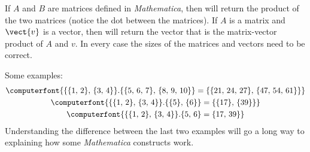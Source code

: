 If $A$ and $B$ are matrices defined in {\sl Mathematica}, then  will return the product of the two matrices (notice the dot between the matrices).  If $A$ is a matrix and $\vect{v}$ is a vector, then  will return the vector that is the matrix-vector product of $A$ and $v$.  In every case the sizes of the matrices and vectors need to be correct.\par
%
Some examples:
%
%
\begin{gather*}
\computerfont{\{\{1,\,2\},\, \{3,\,4\}\}.\{\{5,\,6,\,7\},\,\{8,\,9,\,10\}\} =
\{\{21,\,24,\,27\},\,\{47,\,54,\,61\}\}}\\
\computerfont{\{\{1,\,2\},\, \{3,\,4\}\}.\{\{5\},\,\{6\}\} = \{\{17\},\,\{39\}\}}\\
\computerfont{\{\{1,\,2\},\, \{3,\,4\}\}.\{5,\,6\} = \{17,\,39\}}
\end{gather*}
%
Understanding the difference between the last two examples will go a long way to explaining how some {\sl Mathematica} constructs work.
